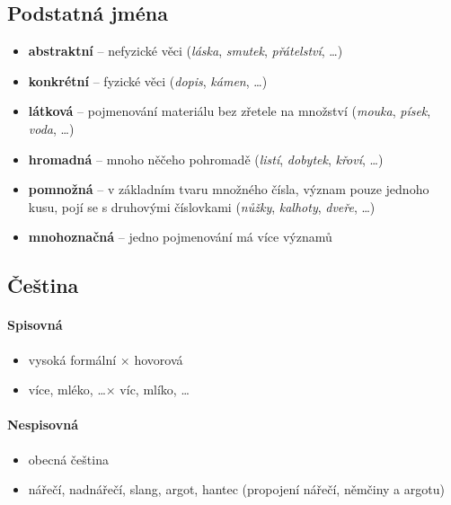 \subsection{Podstatná jména}
\begin{itemize}
\item \textbf{abstraktní} -- nefyzické věci (\textit{láska}, \textit{smutek}, \textit{přátelství}, \ldots)
\item \textbf{konkrétní} -- fyzické věci (\textit{dopis}, \textit{kámen}, \ldots)
\item \textbf{látková} -- pojmenování materiálu bez zřetele na množství (\textit{mouka}, \textit{písek}, \textit{voda}, \ldots)
\item \textbf{hromadná} -- mnoho něčeho pohromadě (\textit{listí}, \textit{dobytek}, \textit{křoví}, \ldots)
\item \textbf{pomnožná} -- v základním tvaru množného čísla, význam pouze jednoho kusu, pojí se s druhovými číslovkami (\textit{nůžky}, \textit{kalhoty}, \textit{dveře}, \ldots)
\item \textbf{mnohoznačná} -- jedno pojmenování má více významů
\end{itemize}

\subsection{Čeština}
\paragraph{Spisovná}
\begin{itemize}
\item vysoká formální $\times$ hovorová
\item více, mléko, \ldots $\times$ víc, mlíko, \ldots
\end{itemize}

\paragraph{Nespisovná}
\begin{itemize}
\item obecná čeština 
\item nářečí, nadnářečí, slang, argot, hantec (propojení nářečí, němčiny a argotu)
\end{itemize}

